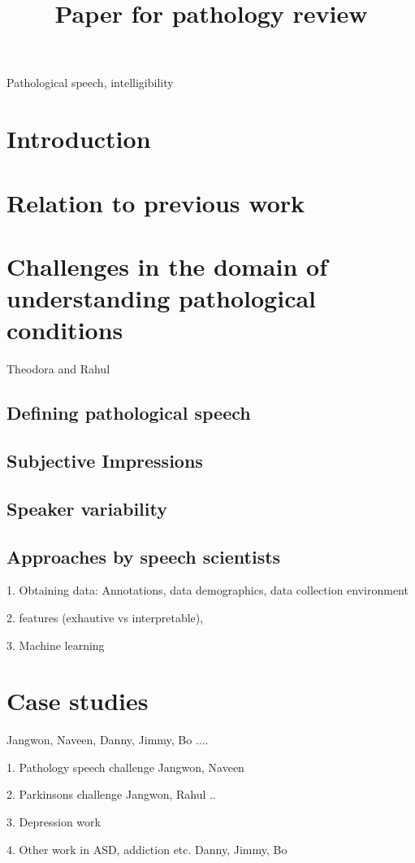 \documentclass{article}
\title{Paper for pathology review}
\begin{document}
\ninept
%
\maketitle
%
\begin{abstract}
 
\end{abstract}
%
\begin{keywords}
Pathological speech, intelligibility 
\end{keywords}
%
\section{Introduction}
\label{sec:intro}

\section{Relation to previous work}

\section{Challenges in the domain of understanding pathological conditions}
Theodora and Rahul
\subsection{Defining pathological speech}
\subsection{Subjective Impressions}
\subsection{Speaker variability}
\subsection{Approaches by speech scientists}

1. Obtaining data: Annotations, data demographics, data collection environment

2. features (exhautive vs interpretable),

3. Machine learning


\section{Case studies}
Jangwon, Naveen, Danny, Jimmy, Bo ....

1. Pathology speech challenge
Jangwon, Naveen

2. Parkinsons challenge
Jangwon, Rahul ..

3. Depression work

4. Other work in ASD, addiction etc. 
Danny, Jimmy, Bo
\vfill\pagebreak



\end{document}

